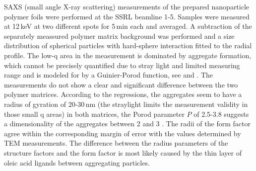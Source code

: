 SAXS (small angle X-ray scattering) measurements of the prepared nanoparticle polymer foils were performed at the SSRL beamline 1-5. Samples were measured at 12\,keV  at two different spots for 5\,min each and averaged. A subtraction of the separately meassured polymer matrix background was performed and a size distribution of spherical particles with hard-sphere interaction fitted to the radial profile. The low-q area in the measurement is dominated by aggregate formation, which cannot be precisely quantified due to stray light and limited measuring range and is modeled for by a Guinier-Porod function, see   and   \cite{percus1958,feigin1987,Ilavsky2009}.
The measurements do not show a clear and significant difference between the two polymer matrices. According to the regressions, the aggregates seem to have a radius of gyration of 20-30\,nm (the straylight limits the measurement validity in those small q areas) in both matrices, the Porod parameter $P$ of 2.5-3.8 suggests a dimensionality of the aggregates between 2 and 3 \cite{feigin1987,lili2005}. The radii of the form factor agree within the corresponding margin of error with the values determined by TEM measurements. The difference between the radius parameters of the structure factors and the form factor is most likely caused by the thin layer of oleic acid ligands between aggregating particles.


